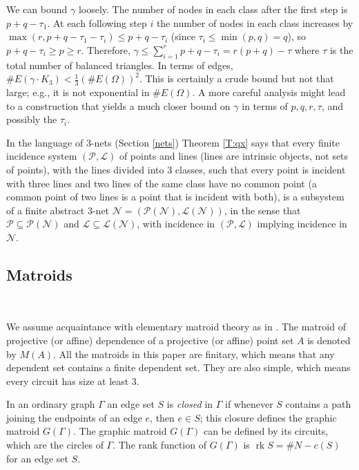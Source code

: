 \documentclass[reqno,12pt]{amsart}
\newcommand \comment[1]{}				%
\theoremstyle{remark}
\numberwithin{equation}{section}
\numberwithin{figure}{section}
\newcommand \rk{\operatorname{rk}}
\renewcommand \cL{\mathcal{L}}	%
\newcommand \cN{\mathcal{N}}
\newcommand \cP{\mathcal{P}}
\begin{document}
We can bound $\gamma$ loosely.  The number of nodes in each class after the first step is $p+q-\tau_1$.  At each following step $i$ the number of nodes in each class increases by $\max(r, p+q-\tau_1-\tau_i) \leq p+q-\tau_i$ (since $\tau_i \leq \min(p,q)=q$), so $p+q-\tau_i \geq p \geq r$.  Therefore, $\gamma \leq \sum_{i=1}^r p+q-\tau_i = r(p+q)-\tau$ where $\tau$ is the total number of balanced triangles.  In terms of edges, $\#E(\gamma\cdot K_3) < \frac13 (\#E(\Omega))^2$.  This is certainly a crude bound but not that large; e.g., it is not exponential in $\#E(\Omega)$.  A more careful analysis might lead to a construction that yields a much closer bound on $\gamma$ in terms of $p, q, r, \tau$, and possibly the $\tau_i$.

In the language of $3$-nets (Section \ref{nets}) Theorem \ref{T:qx} says that every finite incidence system $(\cP,\cL)$ of points and lines (lines are intrinsic objects, not sets of points), with the lines divided into 3 classes, such that every point is incident with three lines and two lines of the same class have no common point (a common point of two lines is a point that is incident with both), is a subsystem of a finite abstract 3-net $\cN = (\cP(\cN),\cL(\cN))$, in the sense that $\cP \subseteq \cP(\cN)$ and $\cL \subseteq \cL(\cN)$, with incidence in $(\cP,\cL)$ implying incidence in $\cN$.


\subsection{Matroids}\label{matroids}\

We assume acquaintance with elementary matroid theory as in \cite[Chapter 1]{Oxley}.  
The matroid of projective (or affine) dependence of a projective (or affine) point set $A$ is denoted by $M(A)$.  
All the matroids in this paper are finitary, which means that any dependent set contains a finite dependent set.
They are also simple, which means every circuit has size at least 3.

\comment{MAKE CIRCUIT FIGURES.}

In an ordinary graph $\Gamma$ an edge set $S$ is \emph{closed} in $\Gamma$ if whenever $S$ contains a path joining the endpoints of an edge $e$, then $e \in S$; this closure defines the graphic matroid $G(\Gamma)$.  
The graphic matroid $G(\Gamma)$ can be defined by its circuits, which are the circles of $\Gamma$.  
The rank function of $G(\Gamma)$ is $\rk S = \#N - c(S)$ for an edge set $S$.  
\end{document}

